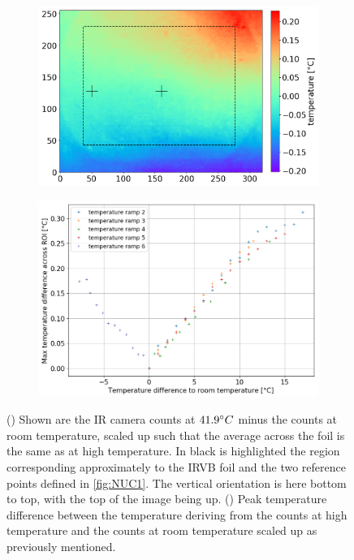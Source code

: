 \begin{figure}[!ht]
     \centering
     \begin{subfigure}{0.7\linewidth}
         \centering
         \includegraphics[trim={0 0 0 0},clip,width=\linewidth]{Chapters/chapter2/figs/NUC_calib6.png}
         \caption{}
         \label{NUC_calib6}
     \end{subfigure}
     \begin{subfigure}{0.7\linewidth}
         \centering
         \includegraphics[trim={0 0 5 0},clip,width=\linewidth]{Chapters/chapter2/figs/NUC_calib5.png}
         \caption{}
         \label{NUC_calib5}
     \end{subfigure}
    \caption{() Shown are the IR camera counts at $41.9\degree C$ minus the counts at room temperature, scaled up such that the average across the foil is the same as at high temperature. In black is highlighted the region corresponding approximately to the IRVB foil and the two reference points defined in \autoref{fig:NUC1}. The vertical orientation is here bottom to top, with the top of the image being up. () Peak temperature difference between the temperature deriving from the counts at high temperature and the counts at room temperature scaled up as previously mentioned.}
    \label{fig:NUC2}
\end{figure}

